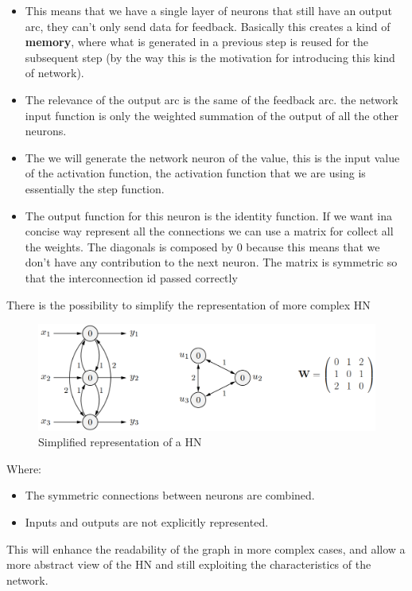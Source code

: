 \documentclass{article}
\begin{document}
\begin{itemize}
    \item This means that we have a single layer of neurons that still have an output arc, they
    can't only send data for feedback.
    Basically this creates a kind of \textbf{memory}, where what is generated in a previous step is reused for the
    subsequent step (by the way this is the motivation for introducing this kind of network).

\item The relevance of the output arc is the same of the feedback arc. the network input function is
    only the weighted summation of the output of all the other neurons.

\item The we will generate the network neuron of the value, this is the input value of the activation
    function, the activation function that we are using is essentially the step function.

\item The output function for this neuron is the identity function. If we want ina concise way represent all
    the connections we can use a matrix for collect all the weights. The diagonals is composed by 0
    because this means that we don't have any contribution to the next neuron. The matrix is symmetric
    so that the interconnection id passed correctly
\end{itemize}
There is the possibility to simplify the representation of more complex HN
\begin{figure}[H]
    \centering
    \includegraphics[scale=0.3]{images/simpliefied_hop.png}
    \caption{Simplified representation of a HN}
    \label{fig:h2}
\end{figure}
Where:
\begin{itemize}
    \item The symmetric connections between neurons are combined.
    \item Inputs and outputs are not explicitly represented.
\end{itemize}
This will enhance the readability of the graph in more complex cases, and allow a more
abstract view of the HN and still exploiting the characteristics of the network.
\end{document}
